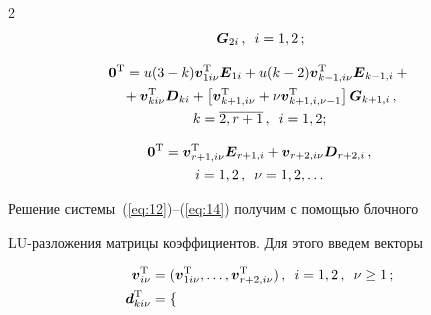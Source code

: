\begin{multicols}{2}
\begin{equation}
\boldsymbol{G}_{2i}\,,\enskip i=1,2\,;\!

\label{eq:12}

\end{equation}

\begin{multline}

\label{eq:13}

\boldsymbol{0}^{\mathrm{T}}=u(3-k)\boldsymbol{v}_{1i\nu}^{\mathrm{T}}\boldsymbol{E}_{1i}+

u(k-2)\boldsymbol{v}_{k-1,i\nu}^{\mathrm{T}}\boldsymbol{E}_{k-1,i}+{}\\

{}+\boldsymbol{v}_{ki\nu}^{\mathrm{T}}\boldsymbol{D}_{ki}

+\left[\boldsymbol{v}_{k+1,i\nu}^{\mathrm{T}}+\nu\boldsymbol{v}_{k+1,i,\nu-1}^{\mathrm{T}}\right]

\boldsymbol{G}_{k+1,i}\,,\\

 k=\overline{2,r+1}\,,\enskip i=1,2;

\end{multline}

\begin{multline}

\label{eq:14}

\boldsymbol{0}^{\mathrm{T}}=\boldsymbol{v}_{r+1,i\nu}^{\mathrm{T}}\boldsymbol{E}_{r+1,i}+

\boldsymbol{v}_{r+2,i\nu}\boldsymbol{D}_{r+2,i}\,,\\

i=1,2\,,\enskip \nu=1,2,\ldots

\end{multline}



Решение системы~(\ref{eq:12})--(\ref{eq:14}) получим с помощью блочного 

LU-разложения матрицы коэффициентов. Для этого введем векторы

\begin{align*}

\boldsymbol{v}_{i\nu}^{\mathrm{T}}&=(\boldsymbol{v}_{1i\nu}^{\mathrm{T}},\ldots,

\boldsymbol{v}_{r+2,i\nu}^{\mathrm{T}})\,,\enskip i=1,2\,,\enskip \nu\geq 1\,;

\\

\boldsymbol{d}_{ki\nu}^{\mathrm{T}}&=

\begin{cases}


\end{cases}
\end{align*}
\end{multicols}
